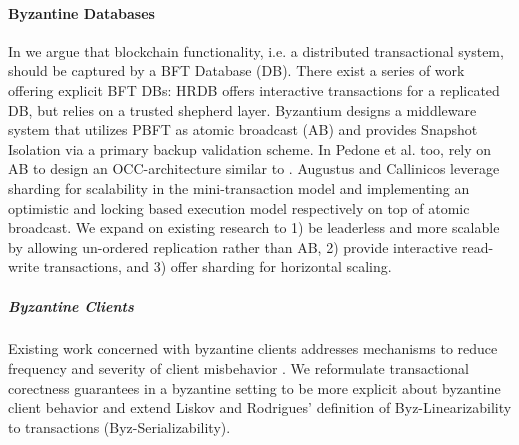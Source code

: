 \paragraph{Byzantine Databases}
In \sys we argue that blockchain functionality, i.e. a distributed transactional system, should be captured by a BFT Database (DB). There exist a series of work offering explicit BFT DBs: HRDB \cite{vandiver2007tolerating} offers interactive transactions for a replicated DB, but relies on a trusted shepherd layer. Byzantium \cite{garcia2011efficient} designs a middleware system that utilizes PBFT as atomic broadcast (AB) and provides Snapshot Isolation via a primary backup validation scheme. In \cite{pedone2012byzantine} Pedone et al. too, rely on AB to design an OCC-architecture similar to \sys. Augustus \cite{padilha2013augustus} and Callinicos \cite{padilha2016callinicos} leverage sharding for scalability in the mini-transaction model \cite{aguilera2007sinfonia} and implementing an optimistic and locking based execution model respectively on top of atomic broadcast.
We expand on existing research to 1) be leaderless and more scalable by allowing un-ordered replication rather than AB, 2) provide interactive read-write transactions, and 3) offer sharding for horizontal scaling.
\subparagraph{Byzantine Clients}
Existing work concerned with byzantine clients addresses mechanisms to reduce frequency and severity of client misbehavior \cite{liskov2006tolerating, garcia2011efficient, pedone2012byzantine, padilha2013augustus, padilha2016callinicos, luiz2011byzantine, }. We reformulate transactional corectness guarantees in a byzantine setting to be more explicit about byzantine client behavior  and extend Liskov and Rodrigues' \cite{liskov2006tolerating} definition of Byz-Linearizability to transactions (Byz-Serializability). 

















